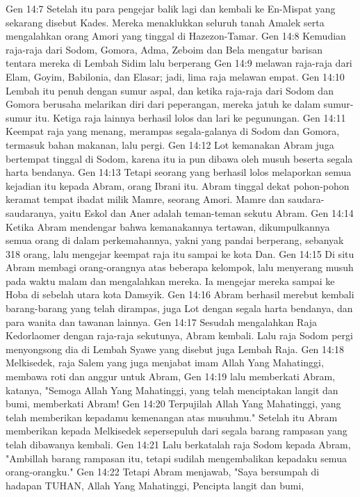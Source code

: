 Gen 14:7  Setelah itu para pengejar balik lagi dan kembali ke En-Mispat yang sekarang disebut Kades. Mereka menaklukkan seluruh tanah Amalek serta mengalahkan orang Amori yang tinggal di Hazezon-Tamar.
Gen 14:8  Kemudian raja-raja dari Sodom, Gomora, Adma, Zeboim dan Bela mengatur barisan tentara mereka di Lembah Sidim lalu berperang
Gen 14:9  melawan raja-raja dari Elam, Goyim, Babilonia, dan Elasar; jadi, lima raja melawan empat.
Gen 14:10  Lembah itu penuh dengan sumur aspal, dan ketika raja-raja dari Sodom dan Gomora berusaha melarikan diri dari peperangan, mereka jatuh ke dalam sumur-sumur itu. Ketiga raja lainnya berhasil lolos dan lari ke pegunungan.
Gen 14:11  Keempat raja yang menang, merampas segala-galanya di Sodom dan Gomora, termasuk bahan makanan, lalu pergi.
Gen 14:12  Lot kemanakan Abram juga bertempat tinggal di Sodom, karena itu ia pun dibawa oleh musuh beserta segala harta bendanya.
Gen 14:13  Tetapi seorang yang berhasil lolos melaporkan semua kejadian itu kepada Abram, orang Ibrani itu. Abram tinggal dekat pohon-pohon keramat tempat ibadat milik Mamre, seorang Amori. Mamre dan saudara-saudaranya, yaitu Eskol dan Aner adalah teman-teman sekutu Abram.
Gen 14:14  Ketika Abram mendengar bahwa kemanakannya tertawan, dikumpulkannya semua orang di dalam perkemahannya, yakni yang pandai berperang, sebanyak 318 orang, lalu mengejar keempat raja itu sampai ke kota Dan.
Gen 14:15  Di situ Abram membagi orang-orangnya atas beberapa kelompok, lalu menyerang musuh pada waktu malam dan mengalahkan mereka. Ia mengejar mereka sampai ke Hoba di sebelah utara kota Damsyik.
Gen 14:16  Abram berhasil merebut kembali barang-barang yang telah dirampas, juga Lot dengan segala harta bendanya, dan para wanita dan tawanan lainnya.
Gen 14:17  Sesudah mengalahkan Raja Kedorlaomer dengan raja-raja sekutunya, Abram kembali. Lalu raja Sodom pergi menyongsong dia di Lembah Syawe yang disebut juga Lembah Raja.
Gen 14:18  Melkisedek, raja Salem yang juga menjabat imam Allah Yang Mahatinggi, membawa roti dan anggur untuk Abram,
Gen 14:19  lalu memberkati Abram, katanya, "Semoga Allah Yang Mahatinggi, yang telah menciptakan langit dan bumi, memberkati Abram!
Gen 14:20  Terpujilah Allah Yang Mahatinggi, yang telah memberikan kepadamu kemenangan atas musuhmu." Setelah itu Abram memberikan kepada Melkisedek sepersepuluh dari segala barang rampasan yang telah dibawanya kembali.
Gen 14:21  Lalu berkatalah raja Sodom kepada Abram, "Ambillah barang rampasan itu, tetapi sudilah mengembalikan kepadaku semua orang-orangku."
Gen 14:22  Tetapi Abram menjawab, "Saya bersumpah di hadapan TUHAN, Allah Yang Mahatinggi, Pencipta langit dan bumi,
